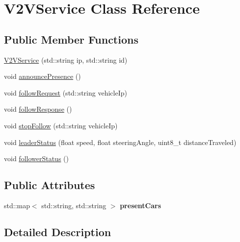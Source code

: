 \hypertarget{class_v2_v_service}{}\section{V2\+V\+Service Class Reference}
\label{class_v2_v_service}
\subsection*{Public Member Functions}
\begin{DoxyCompactItemize}
\item 
\mbox{\hyperlink{class_v2_v_service_a6a49f9bf68deddd2a786ac7fa4d4f55c}{V2\+V\+Service}} (std\+::string ip, std\+::string id)
\item 
void \mbox{\hyperlink{class_v2_v_service_a1e2f575ac83bebcda2c557d425b3050f}{announce\+Presence}} ()
\item 
void \mbox{\hyperlink{class_v2_v_service_a66b75bca64900e74b3308dfe4a48934d}{follow\+Request}} (std\+::string vehicle\+Ip)
\item 
void \mbox{\hyperlink{class_v2_v_service_aaeec2a1f903f5c774a9e874776f1e8eb}{follow\+Response}} ()
\item 
void \mbox{\hyperlink{class_v2_v_service_ad25bfe4c2a0a170f06a1a1f0bf7965c7}{stop\+Follow}} (std\+::string vehicle\+Ip)
\item 
void \mbox{\hyperlink{class_v2_v_service_a6ea5f4b01830ea6e04837a7bd1774b6e}{leader\+Status}} (float speed, float steering\+Angle, uint8\+\_\+t distance\+Traveled)
\item 
void \mbox{\hyperlink{class_v2_v_service_acbf3639c3cbf7610e1c20967ccbab61b}{follower\+Status}} ()
\end{DoxyCompactItemize}
\subsection*{Public Attributes}
\begin{DoxyCompactItemize}
\item 
\mbox{\label{class_v2_v_service_a6e927ef768feea893ccfdc0f16a52b52}} 
std\+::map$<$ std\+::string, std\+::string $>$ {\bfseries present\+Cars}
\end{DoxyCompactItemize}


\subsection{Detailed Description}


